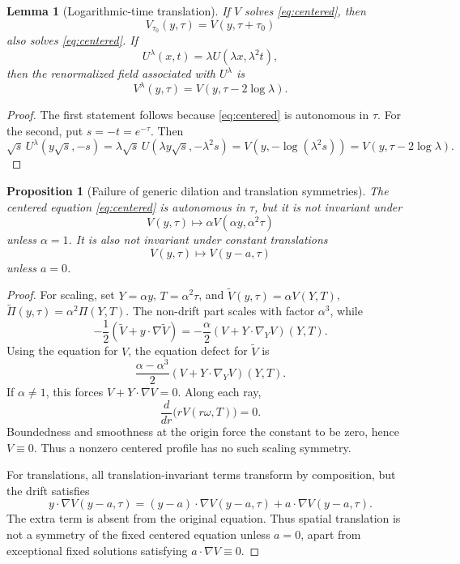 \documentclass[11pt]{amsart}
\theoremstyle{plain}
\newtheorem{proposition}[theorem]{Proposition}
\newtheorem{lemma}[theorem]{Lemma}
\theoremstyle{definition}
\theoremstyle{remark}
\numberwithin{equation}{section}
\begin{document}
\begin{lemma}[Logarithmic-time translation]\label{lem:tau-translation}
If \(V\) solves \eqref{eq:centered}, then
\[
   V_{\tau_0}(y,\tau)=V(y,\tau+\tau_0)
\]
also solves \eqref{eq:centered}.  If
\[
   U^\lambda(x,t)=\lambda U(\lambda x,\lambda^2t),
\]
then the renormalized field associated with \(U^\lambda\) is
\[
   V^\lambda(y,\tau)=V(y,\tau-2\log\lambda).
\]
\end{lemma}

\begin{proof}
The first statement follows because \eqref{eq:centered} is autonomous in
\(\tau\).  For the second, put \(s=-t=e^{-\tau}\).  Then
\[
   \sqrt{s}\,U^\lambda(y\sqrt{s},-s)
   =
   \lambda\sqrt{s}\,U(\lambda y\sqrt{s},-\lambda^2s)
   =
   V(y,-\log(\lambda^2s))
   =
   V(y,\tau-2\log\lambda).
\]
\end{proof}

\begin{proposition}[Failure of generic dilation and translation symmetries]
\label{prop:no-cascade}
The centered equation \eqref{eq:centered} is autonomous in \(\tau\), but it is
not invariant under
\[
   V(y,\tau)\mapsto \alpha V(\alpha y,\alpha^2\tau)
\]
unless \(\alpha=1\).  It is also not invariant under constant translations
\[
   V(y,\tau)\mapsto V(y-a,\tau)
\]
unless \(a=0\).
\end{proposition}

\begin{proof}
For scaling, set \(Y=\alpha y\), \(T=\alpha^2\tau\), and
\(\widetilde V(y,\tau)=\alpha V(Y,T)\),
\(\widetilde\Pi(y,\tau)=\alpha^2\Pi(Y,T)\).  The non-drift part scales with
factor \(\alpha^3\), while
\[
   -\frac12(\widetilde V+y\cdot\nabla\widetilde V)
   =
   -\frac{\alpha}{2}(V+Y\cdot\nabla_YV)(Y,T).
\]
Using the equation for \(V\), the equation defect for \(\widetilde V\) is
\[
   \frac{\alpha-\alpha^3}{2}(V+Y\cdot\nabla_YV)(Y,T).
\]
If \(\alpha\ne1\), this forces \(V+Y\cdot\nabla V=0\).  Along each ray,
\[
   \frac{d}{dr}\bigl(rV(r\omega,T)\bigr)=0.
\]
Boundedness and smoothness at the origin force the constant to be zero, hence
\(V\equiv0\).  Thus a nonzero centered profile has no such scaling symmetry.

For translations, all translation-invariant terms transform by composition,
but the drift satisfies
\[
   y\cdot\nabla V(y-a,\tau)
   =
   (y-a)\cdot\nabla V(y-a,\tau)+a\cdot\nabla V(y-a,\tau).
\]
The extra term is absent from the original equation.  Thus spatial
translation is not a symmetry of the fixed centered equation unless \(a=0\),
apart from exceptional fixed solutions satisfying \(a\cdot\nabla V\equiv0\).
\end{proof}
\end{document}
